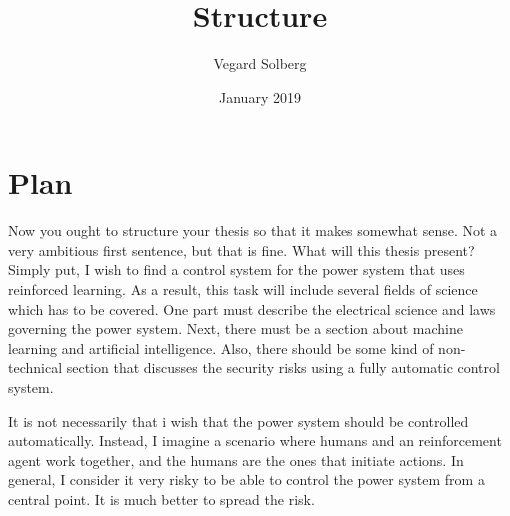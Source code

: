 \documentclass{article}
\title{Structure}
\author{Vegard Solberg}
\date{January 2019}
\begin{document}
\maketitle

\section*{Plan}
Now you ought to structure your thesis so that it makes somewhat sense. Not a very ambitious first sentence, but that is fine. What will this thesis present? Simply put, I wish to find a control system for the power system that uses reinforced learning. As a result, this task will include several fields of science which has to be covered. One part must describe the electrical science and laws governing the power system. Next, there must be a section about machine learning and artificial intelligence. Also, there should be some kind of non-technical section that discusses the security risks using a fully automatic control system. 

It is not necessarily that i wish that the power system should be controlled automatically. Instead, I imagine a scenario where humans and an reinforcement agent work together, and the humans are the ones that initiate actions. In general, I consider it very risky to be able to control the power system from a central point. It is much better to spread the risk. 
\end{document}
